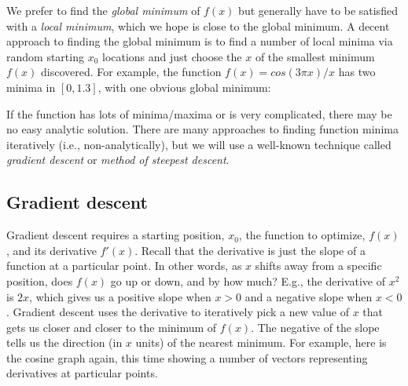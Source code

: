 \documentclass[titlepage]{tufte-book}
\begin{document}
\begin{fullwidth}
We prefer to find the {\em global minimum} of $f(x)$ but generally have to be satisfied with a {\em local minimum}, which we hope is close to the global minimum. A decent approach to finding the global minimum is to find a number of local minima via random starting $x_0$ locations and just choose the $x$ of the smallest minimum $f(x)$ discovered. For example, the function $f(x) = cos(3\pi x) / x$ has two minima in $[0,1.3]$, with one obvious global minimum:

\begin{center}
\end{center}

If the function has lots of minima/maxima or is very complicated, there may be no easy analytic solution.
There are many approaches to finding function minima iteratively (i.e., non-analytically), but we will use a well-known technique called {\em gradient descent} or {\em method of steepest descent}.  

\subsection{Gradient descent}

Gradient descent requires a starting position, $x_0$, the function to optimize, $f(x)$, and its derivative $f'(x)$.  Recall that the derivative is just the slope of a function at a particular point. In other words, as $x$ shifts away from a specific position, does $f(x)$ go up or down, and by how much?  E.g., the derivative of $x^2$ is $2x$, which gives us a positive slope when $x>0$ and a negative slope when $x<0$.  Gradient descent uses the derivative to iteratively pick a new value of $x$ that gets us closer and closer to the minimum of $f(x)$.   The negative of the slope tells us the direction (in $x$ units) of the nearest minimum. For example, here is the cosine graph again, this time showing a number of vectors representing derivatives at particular points.


\end{fullwidth}
\end{document}
